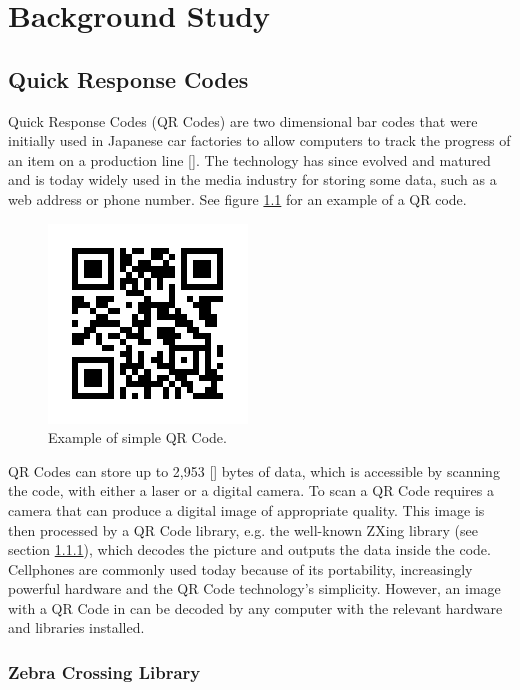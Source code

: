 \chapter{Background Study}

\section{Quick Response Codes}

Quick Response Codes (QR Codes) are two dimensional bar codes that were initially
 used in Japanese car factories to allow computers to track the progress of
 an item on a production line [\cite{website:denso-qrcode}]. The technology has
 since evolved and matured and is today widely used in the media industry for storing some
 data, such as a web address or phone number. See figure \ref{qrcode} for an example of a QR
 code.
 
 \begin{figure}[h]
\centering
\includegraphics[scale = 0.7]{qrcode_voorbeeld.png}
\caption{Example of simple QR Code.}
\label{qrcode}
\end{figure}
 
 QR Codes can store up to 2,953 [\cite{website:denso-qrcode}] bytes of
 data, which is accessible by scanning the code, with either a laser or a
 digital camera. To scan a QR Code requires a camera that can produce a
 digital image of appropriate quality. This image is then processed by a QR Code library, e.g. the
 well-known ZXing library (see section \ref{sec:zbar}), which decodes the picture and outputs
 the data inside the code. Cellphones are commonly used today because of its portability,
 increasingly powerful hardware and the QR Code technology's simplicity.
 However, an image with a QR Code in can be decoded by any computer with the relevant hardware
 and libraries installed.

\subsection{Zebra Crossing Library}
\label{sec:zbar}

